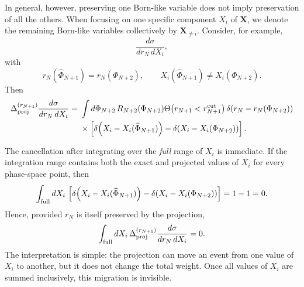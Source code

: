 \documentclass[11pt]{article}
\newcommand{\rn}{r_N}
\newcommand{\rnp}{r_{N+1}}
\newcommand{\cut}{\mathrm{cut}}
\newcommand{\Ph}{\Phi}
\begin{document}
In general, however, preserving one Born-like variable does not imply preservation of all the others.
When focusing on one specific component \(X_i\) of \(\mathbf X\), we denote the remaining Born-like variables
collectively by \(\mathbf X_{\neq i}\). Consider, for example,
\begin{equation}
\frac{d\sigma}{d\rn\,dX_i},
\label{eq:rn-x-spectrum}
\end{equation}
with
\begin{equation}
\rn(\widehat\Ph_{N+1})=\rn(\Ph_{N+2}),
\qquad
X_i(\widehat\Ph_{N+1})\neq X_i(\Ph_{N+2}).
\label{eq:rn-preserved-x-not}
\end{equation}
Then
\begin{align}
\Delta_{\rm proj}^{(\rnp)}
\frac{d\sigma}{d\rn\,dX_i}
={}&
\int d\Ph_{N+2}\,
R_{N+2}(\Ph_{N+2})
\Theta\!\left(\rnp<\rnp^{\cut}\right)
\delta\!\left(\rn-\rn(\Ph_{N+2})\right)
\nonumber\\
&\times
\left[
\delta\!\left(X_i-X_i(\widehat\Ph_{N+1})\right)
-
\delta\!\left(X_i-X_i(\Ph_{N+2})\right)
\right].
\label{eq:rn-x-proj}
\end{align}

The cancellation after integrating over the \emph{full} range of \(X_i\) is immediate. If the integration
range contains both the exact and projected values of \(X_i\) for every phase-space point, then
\begin{equation}
\int_{\rm full} dX_i\,
\left[
\delta\!\left(X_i-X_i(\widehat\Ph_{N+1})\right)
-
\delta\!\left(X_i-X_i(\Ph_{N+2})\right)
\right]
=1-1=0.
\label{eq:x-full-range-cancellation}
\end{equation}
Hence, provided \(\rn\) is itself preserved by the projection,
\begin{equation}
\int_{\rm full} dX_i\,
\Delta_{\rm proj}^{(\rnp)}
\frac{d\sigma}{d\rn\,dX_i}
=0.
\label{eq:x-integrated-zero}
\end{equation}
The interpretation is simple: the projection can move an event from one value of \(X_i\) to another, but
it does not change the total weight. Once all values of \(X_i\) are summed inclusively, this migration is
invisible.
\end{document}
